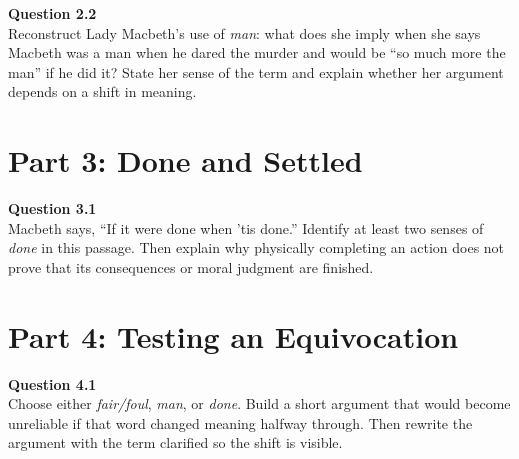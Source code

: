 \documentclass[12pt]{article}
\begin{document}

\textbf{Question 2.2}\\[-0.15em]
Reconstruct Lady Macbeth's use of \textit{man}: what does she imply when she says Macbeth was a man when he dared the murder and would be ``so much more the man'' if he did it? State her sense of the term and explain whether her argument depends on a shift in meaning.


\newpage

\section*{Part 3: Done and Settled}

\textbf{Question 3.1}\\[-0.15em]
Macbeth says, ``If it were done when 'tis done.'' Identify at least two senses of \textit{done} in this passage. Then explain why physically completing an action does not prove that its consequences or moral judgment are finished.


\section*{Part 4: Testing an Equivocation}

\textbf{Question 4.1}\\[-0.15em]
Choose either \textit{fair/foul}, \textit{man}, or \textit{done}. Build a short argument that would become unreliable if that word changed meaning halfway through. Then rewrite the argument with the term clarified so the shift is visible.

\end{document}
